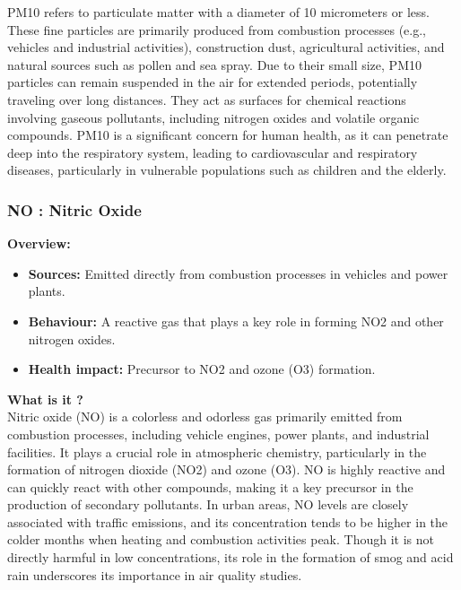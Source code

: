 \documentclass{modeleRapport}
\begin{document}
PM10 refers to particulate matter with a diameter of 10 micrometers or less. These fine particles are primarily produced 
from combustion processes (e.g., vehicles and industrial activities), construction dust, agricultural activities, 
and natural sources such as pollen and sea spray. Due to their small size, PM10 particles can remain suspended in the air 
for extended periods, potentially traveling over long distances. They act as surfaces for chemical reactions involving 
gaseous pollutants, including nitrogen oxides and volatile organic compounds. PM10 is a significant concern for human health, 
as it can penetrate deep into the respiratory system, leading to cardiovascular and respiratory diseases, particularly in 
vulnerable populations such as children and the elderly.\\


\subsubsection{NO : Nitric Oxide}

\textbf{Overview:}\\

\begin{itemize}
    \item \textbf{Sources:} Emitted directly from combustion processes in vehicles and power plants.
    \item \textbf{Behaviour:} A reactive gas that plays a key role in forming NO2 and other nitrogen oxides.
    \item \textbf{Health impact:} Precursor to NO2 and ozone (O3) formation.\\
\end{itemize}

\textbf{What is it ?}\\

Nitric oxide (NO) is a colorless and odorless gas primarily emitted from combustion processes, 
including vehicle engines, power plants, and industrial facilities. It plays a crucial role in atmospheric chemistry, 
particularly in the formation of nitrogen dioxide (NO2) and ozone (O3). NO is highly reactive and can quickly react with 
other compounds, making it a key precursor in the production of secondary pollutants. In urban areas, NO levels are closely 
associated with traffic emissions, and its concentration tends to be higher in the colder months when heating and combustion 
activities peak. Though it is not directly harmful in low concentrations, its role in the formation of smog and acid rain 
underscores its importance in air quality studies.\\
\end{document}
